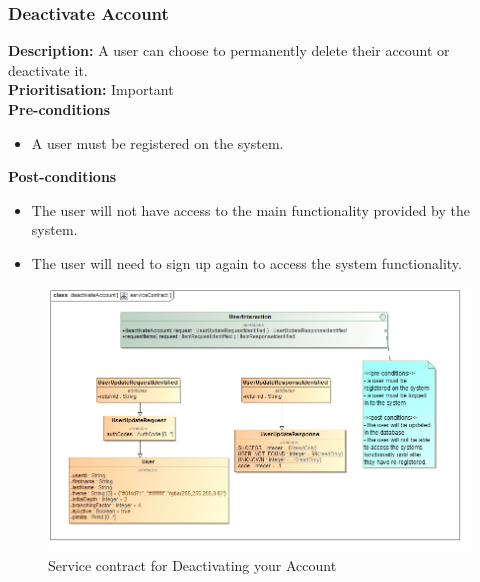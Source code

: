 \documentclass[hidelinks,english]{article}
\begin{document}
    		\subsubsection{Deactivate Account}
				\textbf{Description:}  A user can choose to permanently delete their account or deactivate it.\\
    			\textbf{Prioritisation:} Important\\
      			\textbf{Pre-conditions}
    			\begin{itemize}
        			\item A user must be registered on the system.
    			\end{itemize}
    			\textbf{Post-conditions}
     			\begin{itemize}
        			\item The user will not have access to the main functionality provided by the system.
        			\item The user will need to sign up again to access the system functionality.
    			\end{itemize}
    			
    			\begin{figure}[!h]
    			\includegraphics[width=\linewidth]{deactivateAccountServiceContract.jpg}
    			\caption{Service contract for Deactivating your Account}
    			\label{UseCaseDeactivateAccount}
    			\end{figure}
    			
			    
\end{document}
